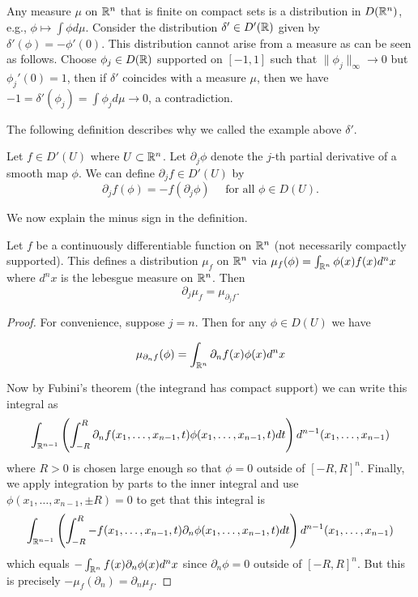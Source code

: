 \documentclass[twoside, a4paper, 10pt]{amsart}
\begin{document}
\begin{eg} Any measure $\mu$ on $\mathbb{R}^n$ that is finite on compact sets is a distribution in $D(\mathbb{R}^n)$, e.g., $\phi \mapsto \int \phi d\mu$. Consider the distribution $\delta' \in D'(\mathbb{R})$ given by $\delta'(\phi) = -\phi'(0)$. This distribution cannot arise from a measure as can be seen as follows. Choose $\phi_j \in D(\mathbb{R})$ supported on $[-1,1]$ such that $\| \phi_j \|_{\infty} \to 0$ but $\phi_j'(0) = 1$, then if $\delta'$ coincides with a measure $\mu$, then we have $-1 = \delta'(\phi_j) = \int \phi_j d\mu \to 0 $, a contradiction.

\end{eg}

The following definition describes why we called the example above $\delta'$.

\begin{mydef} Let $f \in D'(U)$ where $U \subset \mathbb{R}^n$. Let $\partial_j \phi$ denote the $j$-th partial derivative of a smooth map $\phi$. We can define $\partial_j f \in D'(U)$ by $$\partial_j f (\phi) = - f(\partial_j \phi) \quad \text{ for all } \phi \in D(U).$$ 

\end{mydef}

We now explain the minus sign in the definition.

\begin{prop} Let $f$ be a continuously differentiable function on $\mathbb{R}^n$ (not necessarily compactly supported). This defines a distribution $\mu_f$ on $\mathbb{R}^n$ via $\mu_f (\phi) = \int_{\mathbb{R}^n} \phi(x) f(x) d^n x$ where $d^n x$ is the lebesgue measure on $\mathbb{R}^n$. Then $$\partial_j \mu_f = \mu_{\partial_j f}.$$

\end{prop}

\begin{proof} For convenience, suppose $j = n$. Then for any $\phi \in D(U)$ we have 

$$ \mu_{\partial_n f} (\phi) = \int_{\mathbb{R}^n} \partial_n f(x) \phi (x) d^n x $$

Now by Fubini's theorem (the integrand has compact support) we can write this integral as $$ \int_{\mathbb{R}^{n-1}} \left(\int_{-R}^{R} \partial_n f(x_1, \ldots, x_{n-1}, t) \phi (x_1, \ldots, x_{n-1}, t)  dt \right) d^{n-1}(x_1, \ldots, x_{n-1})$$ where $R > 0$ is chosen large enough so that $\phi = 0$ outside of $[-R,R]^n$. Finally, we apply integration by parts to the inner integral and use $\phi(x_1, \ldots, x_{n-1}, \pm R) = 0$ to get that this integral is $$\int_{\mathbb{R}^{n-1}} \left(\int_{-R}^{R} - f(x_1, \ldots, x_{n-1}, t) \partial_n \phi (x_1, \ldots, x_{n-1}, t)  dt \right) d^{n-1}(x_1, \ldots, x_{n-1})$$ which equals $- \int_{\mathbb{R}^n} f(x) \partial_n \phi(x) d^n x$ since $\partial_n \phi = 0$ outside of $[-R,R]^n$.  But this is precisely $-\mu_f(\partial_n) = \partial_n \mu_f$. \end{proof}
\end{document}
